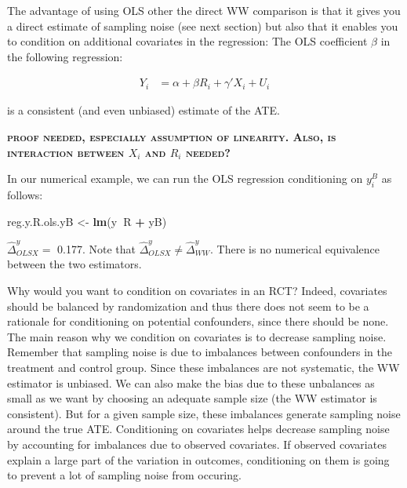 \documentclass[]{book}
\newenvironment{Shaded}{\begin{snugshade}}{\end{snugshade}}
\newcommand{\KeywordTok}[1]{\textcolor[rgb]{0.13,0.29,0.53}{\textbf{#1}}}
\newcommand{\StringTok}[1]{\textcolor[rgb]{0.31,0.60,0.02}{#1}}
\newcommand{\OperatorTok}[1]{\textcolor[rgb]{0.81,0.36,0.00}{\textbf{#1}}}
\newcommand{\NormalTok}[1]{#1}
\theoremstyle{definition}
\theoremstyle{definition}
\theoremstyle{definition}
\theoremstyle{remark}
\let\BeginKnitrBlock\begin \let\EndKnitrBlock\end
\begin{document}
The advantage of using OLS other the direct WW comparison is that it
gives you a direct estimate of sampling noise (see next section) but
also that it enables you to condition on additional covariates in the
regression: The OLS coefficient \(\beta\) in the following regression:

\begin{align*}
    Y_i &  = \alpha +  \beta R_i + \gamma' X_i + U_i
    \end{align*}

is a consistent (and even unbiased) estimate of the ATE.

\textbf{\textsc{proof needed, especially assumption of linearity. Also,
is interaction between \(X_i\) and \(R_i\) needed?}}

\BeginKnitrBlock{example}
\protect\hypertarget{exm:unnamed-chunk-72}{}{\label{exm:unnamed-chunk-72}
}In our numerical example, we can run the OLS regression conditioning on
\(y_i^B\) as follows:
\EndKnitrBlock{example}

\begin{Shaded}
\begin{Highlighting}[]
\NormalTok{reg.y.R.ols.yB <-}\StringTok{ }\KeywordTok{lm}\NormalTok{(y}\OperatorTok{~}\NormalTok{R }\OperatorTok{+}\StringTok{ }\NormalTok{yB)}
\end{Highlighting}
\end{Shaded}

\(\hat{\Delta}^y_{OLSX}=\) 0.177. Note that
\(\hat{\Delta}^y_{OLSX}\neq\hat{\Delta}^y_{WW}\). There is no numerical
equivalence between the two estimators.

\BeginKnitrBlock{remark}
\iffalse{} {Remark. } \fi{}Why would you want to condition on covariates
in an RCT? Indeed, covariates should be balanced by randomization and
thus there does not seem to be a rationale for conditioning on potential
confounders, since there should be none. The main reason why we
condition on covariates is to decrease sampling noise. Remember that
sampling noise is due to imbalances between confounders in the treatment
and control group. Since these imbalances are not systematic, the WW
estimator is unbiased. We can also make the bias due to these unbalances
as small as we want by choosing an adequate sample size (the WW
estimator is consistent). But for a given sample size, these imbalances
generate sampling noise around the true ATE. Conditioning on covariates
helps decrease sampling noise by accounting for imbalances due to
observed covariates. If observed covariates explain a large part of the
variation in outcomes, conditioning on them is going to prevent a lot of
sampling noise from occuring.
\EndKnitrBlock{remark}
\end{document}
